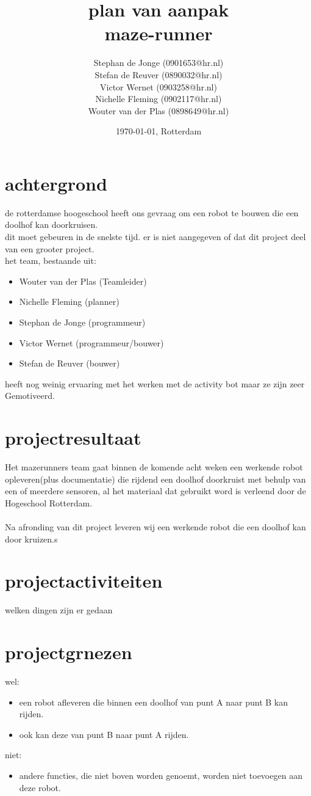 \documentclass[oneside]{book}
\title{plan van aanpak\\maze-runner}
\author{
	Stephan de Jonge (0901653@hr.nl)\\
	Stefan de Reuver (0890032@hr.nl)\\
	Victor Wernet (0903258@hr.nl)\\
	Nichelle Fleming (0902117@hr.nl)\\
	Wouter van der Plas (0898649@hr.nl)
}
\date{\today, Rotterdam}
\begin{document}
\maketitle
\tableofcontents


\chapter{achtergrond}

de rotterdamse hoogeschool heeft ons gevraag om een robot te bouwen die een doolhof kan doorkruisen.\\
dit moet gebeuren in de snelste tijd. er is niet aangegeven of dat dit project deel van een grooter project.\\
het team, bestaande uit:\\
\begin{itemize}
	\item Wouter van der Plas (Teamleider)
	\item Nichelle Fleming (planner)
	\item Stephan de Jonge (programmeur)
	\item Victor Wernet (programmeur/bouwer)
	\item Stefan de Reuver (bouwer)
\end{itemize}	
heeft nog weinig ervaaring met het werken met de activity bot maar ze zijn zeer Gemotiveerd.\\

\clearpage
\chapter{projectresultaat}
Het mazerunners team gaat binnen de komende acht weken een werkende robot opleveren(plus documentatie) die rijdend een doolhof doorkruist met behulp van een of meerdere sensoren, al het materiaal dat gebruikt word is verleend door de Hogeschool Rotterdam.\\
\\
Na afronding van dit project leveren wij een werkende robot die een doolhof kan door kruizen.s
\clearpage
\chapter{projectactiviteiten}
welken dingen zijn er gedaan
\clearpage
\chapter{projectgrnezen}
wel:\\
\begin{itemize}
	\item een robot afleveren die binnen een doolhof van punt A naar punt 
	B kan rijden.
	\item ook kan deze van punt B naar punt A rijden.
\end{itemize}
niet:\\
\begin{itemize}
	\item andere functies, die niet boven worden genoemt, worden niet toevoegen aan deze robot.
\end{itemize}
\clearpage
\end{document}
